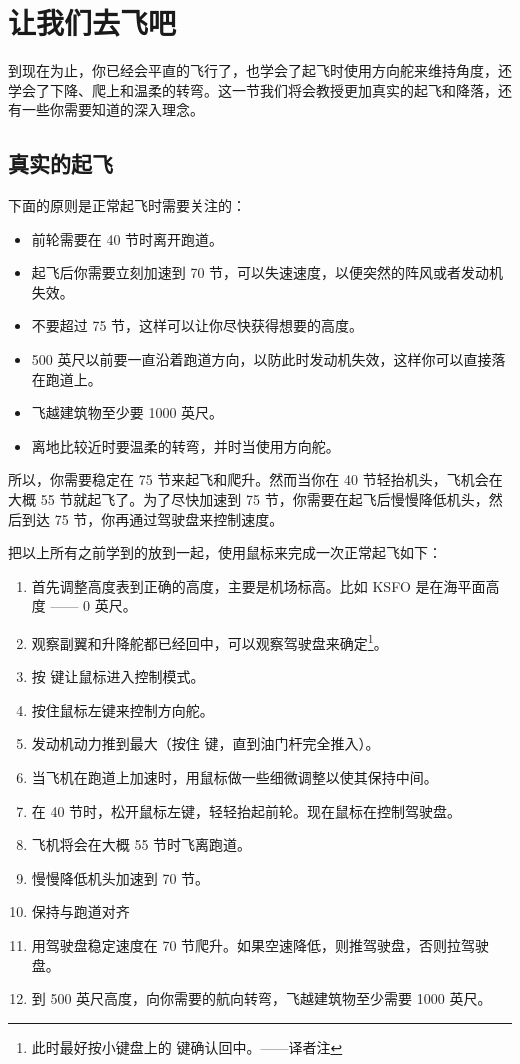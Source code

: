 \section{让我们去飞吧}

到现在为止，你已经会平直的飞行了，也学会了起飞时使用方向舵来维持角度，还学会了下降、爬上和温柔的转弯。这一节我们将会教授更加真实的起飞和降落，还有一些你需要知道的深入理念。

\subsection{真实的起飞}
\label{sec:Start}

下面的原则是正常起飞时需要关注的：

\begin{itemize}
    \item 前轮需要在 40 节时离开跑道。
    \item 起飞后你需要立刻加速到 70 节，可以失速速度，以便突然的阵风或者发动机失效。
    \item 不要超过 75 节，这样可以让你尽快获得想要的高度。
    \item 500 英尺以前要一直沿着跑道方向，以防此时发动机失效，这样你可以直接落在跑道上。
    \item 飞越建筑物至少要 1000 英尺。
    \item 离地比较近时要温柔的转弯，并时当使用方向舵。
\end{itemize}

所以，你需要稳定在 75 节来起飞和爬升。然而当你在 40 节轻抬机头，飞机会在大概 55 节就起飞了。为了尽快加速到 75 节，你需要在起飞后慢慢降低机头，然后到达 75 节，你再通过驾驶盘来控制速度。

把以上所有之前学到的放到一起，使用鼠标来完成一次正常起飞如下：

\begin{enumerate}
  \item 首先调整高度表到正确的高度，主要是机场标高。比如 KSFO 是在海平面高度 —— 0 英尺。
 \item 观察副翼和升降舵都已经回中，可以观察驾驶盘来确定\footnote{此时最好按小键盘上的  键确认回中。——译者注}。
 \item 按  键让鼠标进入控制模式。
 \item 按住鼠标左键来控制方向舵。
 \item 发动机动力推到最大（按住  键，直到油门杆完全推入）。
 \item 当飞机在跑道上加速时，用鼠标做一些细微调整以使其保持中间。
 \item 在 40 节时，松开鼠标左键，轻轻抬起前轮。现在鼠标在控制驾驶盘。
 \item 飞机将会在大概 55 节时飞离跑道。
 \item 慢慢降低机头加速到 70 节。
 \item 保持与跑道对齐
 \item 用驾驶盘稳定速度在 70 节爬升。如果空速降低，则推驾驶盘，否则拉驾驶盘。
 \item 到 500 英尺高度，向你需要的航向转弯，飞越建筑物至少需要 1000 英尺。
\end{enumerate}

